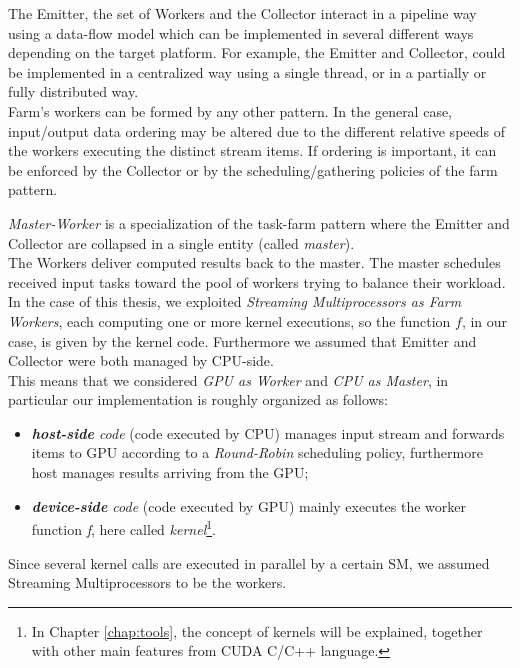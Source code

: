 	The Emitter, the set of Workers and the Collector interact in a pipeline way using a data-flow model which can be implemented in several different ways depending on the target platform.  For example, the Emitter and Collector, could be implemented in a centralized way using a single thread, or in a partially or fully distributed way.\\
	Farm's workers can be formed by any other pattern\cite{spm}.
	In the general case, input/output data ordering may be altered due to the different relative speeds of the workers executing the distinct stream items. If ordering is important, it can be enforced by the Collector or by the scheduling/gathering policies of the farm pattern.  
	
	\textit{Master-Worker} is a specialization of the task-farm pattern where the Emitter and Collector are collapsed in a single entity (called \textit{master}).\\
	The Workers deliver computed results back to the master. The master schedules received input tasks toward the pool of workers trying to balance their workload\cite{parpattbench}.\\
	
	In the case of this thesis, we exploited \textit{Streaming Multiprocessors as Farm Workers}, each computing one or more kernel executions, so the function \(f\), in our case, is given by the kernel code. Furthermore we assumed that Emitter and Collector were both managed by CPU-side.\\
	This means that we considered \textit{GPU as Worker} and \textit{CPU as Master}, in particular our implementation is roughly organized as follows:
	\begin{itemize}
		\item \textit{\textbf{host-side} code} (code executed by CPU) manages input stream and forwards items to GPU according to a  \textit{Round-Robin} scheduling policy, furthermore host manages results arriving from the GPU;
		\item \textit{\textbf{device-side} code} (code executed by GPU) mainly executes the worker function \textit{f}, here called \textit{kernel}\footnote{In Chapter \ref{chap:tools}, the concept of kernels will be explained, together with other main features from CUDA C/C++ language.}.
	\end{itemize}
	Since several kernel calls are executed in parallel by a certain SM, we assumed Streaming Multiprocessors to be the workers.\\
	
